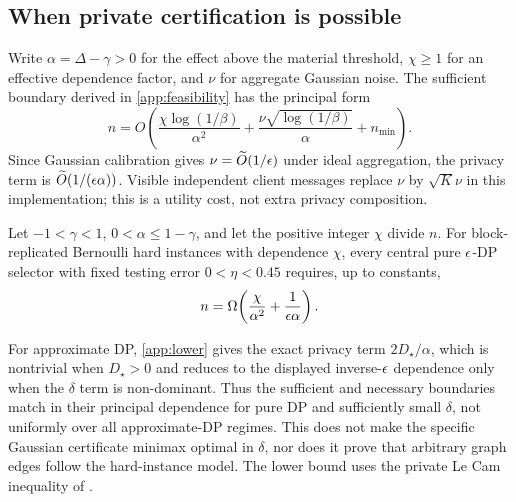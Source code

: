 \subsection{When private certification is possible}

Write $\alpha=\Delta-\gamma>0$ for the effect above the material threshold,
$\chi\geq1$ for an effective dependence factor, and $\nu$ for aggregate
Gaussian noise. The sufficient boundary derived in
\cref{app:feasibility} has the principal form
\begin{equation}
 n=O\!\left(
 \frac{\chi\log(1/\beta)}{\alpha^2}
 {}+\frac{\nu\sqrt{\log(1/\beta)}}{\alpha}
 {}+n_{\min}
 \right).
\label{eq:sufficient-rate}
\end{equation}
Since Gaussian calibration gives
$\nu=\widetilde O(1/\epsilon)$ under ideal aggregation, the privacy term is
$\widetilde O(1/(\epsilon\alpha))$. Visible independent client messages replace
$\nu$ by $\sqrt{K}\nu$ in this implementation; this is a utility cost, not
extra privacy composition.

\begin{theorem}
\label{thm:lower}
Let $-1<\gamma<1$, $0<\alpha\leq1-\gamma$, and let the positive integer
$\chi$ divide $n$. For block-replicated Bernoulli hard instances with
dependence $\chi$, every central pure $\epsilon$-DP selector with fixed testing
error $0<\eta<0.45$ requires, up to constants,
\begin{equation}
 n=\Omega\!\left(\frac{\chi}{\alpha^2}
                 {}+\frac{1}{\epsilon\alpha}\right).
\end{equation}
\end{theorem}

For approximate DP, \cref{app:lower} gives the exact privacy term
$2D_\star/\alpha$, which is nontrivial when $D_\star>0$ and reduces to the
displayed inverse-$\epsilon$ dependence only when the $\delta$ term is
non-dominant. Thus the sufficient and necessary boundaries match in their
principal dependence for pure DP and sufficiently small $\delta$, not
uniformly over all approximate-DP regimes. This does not make the specific
Gaussian certificate minimax optimal in $\delta$, nor does it prove that
arbitrary graph edges follow the hard-instance model. The lower bound uses the
private Le Cam inequality of \cite{acharya2021private}.
